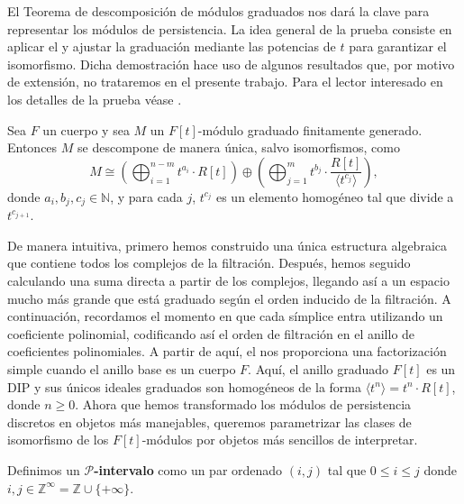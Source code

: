 El Teorema de descomposición de módulos graduados nos dará la clave para representar los módulos de persistencia. La idea general de la prueba consiste en aplicar el  y ajustar la graduación mediante las potencias de $t$ para garantizar el isomorfismo. Dicha demostración hace uso de algunos resultados que, por motivo de extensión, no trataremos en el presente trabajo. Para el lector interesado en los detalles de la prueba véase \cite{webb1985decomposition}.

\begin{teorema}
	\label{teo:desc-mod-grad}
	Sea $F$ un cuerpo y sea \( M \) un \( F[t] \)-módulo graduado finitamente generado. Entonces \( M \) se descompone de manera única, salvo isomorfismos, como
	\[
	M \cong \left( \bigoplus_{i=1}^{n-m} t^{a_i} \cdot R[t] \right) \oplus \left( \bigoplus_{j=1}^{m} t^{b_j} \cdot \frac{R[t]}{\langle t^{c_j} \rangle} \right),
	\]
	donde \( a_i, b_j, c_j \in \mathbb{N} \), y para cada \( j \), \( t^{c_j} \) es un elemento homogéneo tal que divide a \( t^{c_{j+1}} \).
\end{teorema}

De manera intuitiva, primero hemos construido una única estructura algebraica que contiene todos los complejos de la filtración. Después, hemos seguido calculando una suma directa a partir de los complejos, llegando así a un espacio mucho más grande que está graduado según el orden inducido de la filtración. A continuación, recordamos el momento en que cada símplice entra utilizando un coeficiente polinomial, codificando así el orden de filtración en el anillo de coeficientes polinomiales. A partir de aquí, el  nos proporciona una factorización simple cuando el anillo base es un cuerpo \( F \). Aquí, el anillo graduado \( F[t] \) es un DIP y sus únicos ideales graduados son homogéneos de la forma \( \langle t^n \rangle = t^n \cdot R[t] \), donde \( n \geq 0 \). Ahora que hemos transformado los módulos de persistencia discretos en objetos más manejables, queremos parametrizar las clases de isomorfismo de los \( F[t] \)-módulos por objetos más sencillos de interpretar.

\begin{definicion}
	Definimos un \textbf{$\mathcal{P}$-intervalo} como un par ordenado \( (i, j) \) tal que \( 0 \leq i \leq j\) donde \( i,j \in \mathbb{Z}^{\infty} = \mathbb{Z} \cup \{+\infty\} \).
\end{definicion}

